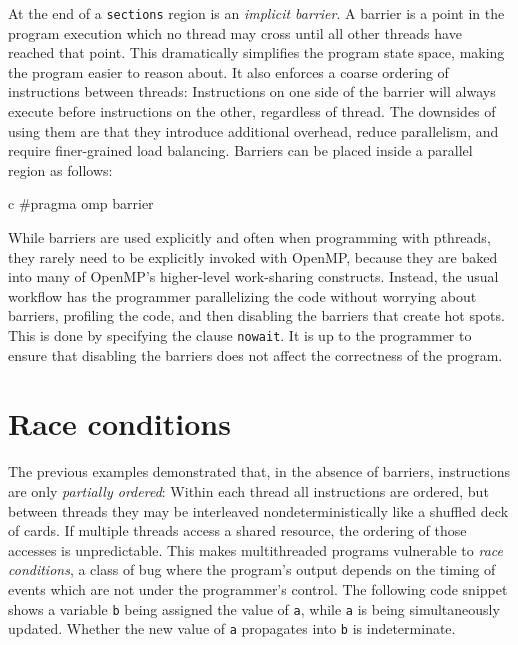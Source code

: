 \documentclass[conference, a4paper]{IEEEtran-modified}
\begin{document}
At the end of a \texttt{sections} region is an \emph{implicit barrier}. A barrier is a point in the program execution which no thread may cross until all other threads have reached that point. This dramatically simplifies the program state space, making the program easier to reason about. It also enforces a coarse ordering of instructions between threads: Instructions on one side of the barrier will always execute before instructions on the other, regardless of thread. The downsides of using them are that they introduce additional overhead, reduce parallelism, and require finer-grained load balancing. Barriers can be placed inside a parallel region as follows:

      \begin{ccode}[]
        {c}
        #pragma omp barrier \end{ccode}


While barriers are used explicitly and often when programming with pthreads, they rarely need to be explicitly invoked with OpenMP, because they are baked into many of OpenMP's higher-level work-sharing constructs. Instead, the usual workflow has the programmer parallelizing the code without worrying about barriers, profiling the code, and then disabling the barriers that create hot spots. This is done by specifying the clause \texttt{nowait}. It is up to the programmer to ensure that disabling the barriers does not affect the correctness of the program.


\section{Race conditions}

The previous examples demonstrated that, in the absence of barriers, instructions are only \emph{partially ordered}: Within each thread all instructions are ordered, but between threads they may be interleaved nondeterministically like a shuffled deck of cards. If multiple threads access a shared resource, the ordering of those accesses is unpredictable. This makes multithreaded programs vulnerable to \emph{race conditions}, a class of bug where the program's output depends on the timing of events which are not under the programmer's control. The following code snippet shows a variable \texttt{b} being assigned the value of \texttt{a}, while \texttt{a} is being simultaneously updated. Whether the new value of \texttt{a} propagates into \texttt{b} is indeterminate.
\end{document}
